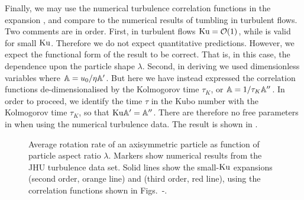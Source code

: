 \documentclass[thesis.tex]{subfiles}
\begin{document}
Finally, we may use the numerical turbulence correlation functions in the expansion , and compare to the numerical results of tumbling in turbulent flows. Two comments are in order. First, in turbulent flows $\mbox{Ku}=\mathcal O(1)$, while  is valid for small $\mbox{Ku}$. Therefore we do not expect quantitative predictions. However, we expect the functional form of the result to be correct. That is, in this case, the dependence upon the particle shape $\lambda$. Second, in deriving  we used dimensionless variables where $\mathbb{A} = u_0/\eta \mathbb{A}'$. But here we have instead expressed the correlation functions de-dimensionalised by the Kolmogorov time $\tau_{K}$, or $\mathbb{A} = 1/\tau_{K} \mathbb{A}''$. In order to proceed, we identify the time $\tau$ in the Kubo number with the Kolmogorov time $\tau_{K}$, so that $\mbox{Ku} \mathbb{A}'= \mathbb{A}''$. There are therefore no free parameters in  when using the numerical turbulence data. The result is shown in . 


\begin{figure}
	\begin{center}
\end{center}
\caption{Average rotation rate of an axisymmetric particle as function of particle aspect ratio $\lambda$. Markers show numerical results from the JHU turbulence data set. Solid lines show the small-$\mbox{Ku}$ expansions  (second order, orange line) and  (third order, red line), using the correlation functions shown in Figs.~-.}%
\end{figure}
\end{document}
